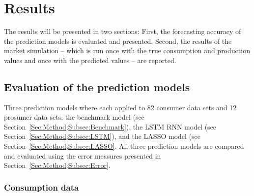 
\section{Results}\label{Sec:Results}

The results will be presented in two sections: First, the forecasting accuracy of the prediction models is evaluated and presented. Second, the results of the market simulation -- which is run once with the true consumption and production values and once with the predicted values -- are reported.



\subsection{Evaluation of the prediction models}\label{Sec:Results;Subsec:Forecast}

Three prediction models where each applied to 82 consumer data sets and 12 prosumer data sets: the benchmark model (see Section~\ref{Sec:Method;Subsec:Benchmark}), the LSTM RNN model (see Section~\ref{Sec:Method;Subsec:LSTM}), and the LASSO model (see Section~\ref{Sec:Method;Subsec:LASSO}. All three prediction models are compared and evaluated using the error measures presented in Section~\ref{Sec:Method;Subsec:Error}.


\subsubsection{Consumption data}

